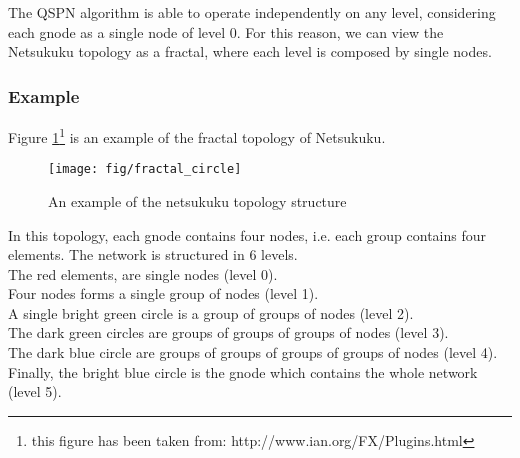 \documentclass[a4paper]{article}
\newcommand{\href}[2]{ #1 }
\begin{document}
The QSPN algorithm is able to operate independently on any level,
considering each gnode as a single node of level 0.
For this reason, we can view the Netsukuku topology as a fractal, where each
level is composed by single nodes.

\subsubsection*{Example}

Figure \ref{fig:fract_circle}\footnote{this figure has been taken from:
\href{http://www.ian.org/FX/Plugins.html}{http://www.ian.org/FX/Plugins.html}}
is an example of the fractal topology of Netsukuku.

\begin{figure}[h]
	\begin{center}
		\texttt{[image: fig/fractal\_circle]}
	\end{center}
	\caption{An example of the netsukuku topology structure}
	\label{fig:fract_circle}
\end{figure}

In this topology, each gnode contains four nodes, i.e. each group contains
four elements. The network is structured in 6 levels.\\
The red elements, are single nodes (level 0).\\
Four nodes forms a single group of nodes (level 1).\\
A single bright green circle is a 
				  group of groups of nodes (level 2).\\
The dark green circles are        groups of groups of groups of nodes (level 3).\\
The dark blue circle are          groups of groups of groups of groups of
nodes (level 4). \\
Finally, the bright blue circle is the gnode which contains the whole network
(level 5).
\end{document}
